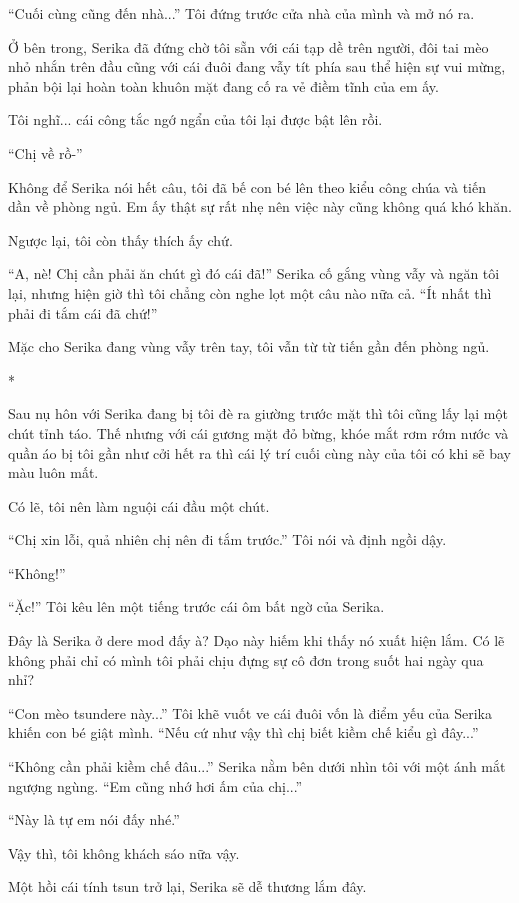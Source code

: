{``Cuối cùng cũng đến nhà...'' Tôi đứng trước cửa nhà của mình và mở nó
ra.

Ở bên trong, Serika đã đứng chờ tôi sẵn với cái tạp dề trên người, đôi
tai mèo nhỏ nhắn trên đầu cũng với cái đuôi đang vẫy tít phía sau thể
hiện sự vui mừng, phản bội lại hoàn toàn khuôn mặt đang cố ra vẻ điềm
tĩnh của em ấy.

Tôi nghĩ... cái công tắc ngớ ngẩn của tôi lại được bật lên rồi.

``Chị về rồ-''

Không để Serika nói hết câu, tôi đã bế con bé lên theo kiểu công chúa và
tiến dần về phòng ngủ. Em ấy thật sự rất nhẹ nên việc này cũng không quá
khó khăn.

Ngược lại, tôi còn thấy thích ấy chứ.

``A, nè! Chị cần phải ăn chút gì đó cái đã!'' Serika cố gắng vùng vẫy và
ngăn tôi lại, nhưng hiện giờ thì tôi chẳng còn nghe lọt một câu nào nữa
cả. ``Ít nhất thì phải đi tắm cái đã chứ!''

Mặc cho Serika đang vùng vẫy trên tay, tôi vẫn từ từ tiến gần đến phòng
ngủ.

*

Sau nụ hôn với Serika đang bị tôi đè ra giường trước mặt thì tôi cũng
lấy lại một chút tỉnh táo. Thế nhưng với cái gương mặt đỏ bừng, khóe mắt
rơm rớm nước và quần áo bị tôi gần như cởi hết ra thì cái lý trí cuối
cùng này của tôi có khi sẽ bay màu luôn mất.

Có lẽ, tôi nên làm nguội cái đầu một chút.

``Chị xin lỗi, quả nhiên chị nên đi tắm trước.'' Tôi nói và định ngồi
dậy.

``Không!''

``Ặc!'' Tôi kêu lên một tiếng trước cái ôm bất ngờ của Serika.

Đây là Serika ở dere mod đấy à? Dạo này hiếm khi thấy nó xuất hiện lắm.
Có lẽ không phải chỉ có mình tôi phải chịu đựng sự cô đơn trong suốt hai
ngày qua nhỉ?

``Con mèo tsundere này...'' Tôi khẽ vuốt ve cái đuôi vốn là điểm yếu của
Serika khiến con bé giật mình. ``Nếu cứ như vậy thì chị biết kiềm chế
kiểu gì đây...''

``Không cần phải kiềm chế đâu...'' Serika nằm bên dưới nhìn tôi với một
ánh mắt ngượng ngùng. ``Em cũng nhớ hơi ấm của chị...''

``Này là tự em nói đấy nhé.''

Vậy thì, tôi không khách sáo nữa vậy.

Một hồi cái tính tsun trở lại, Serika sẽ dễ thương lắm đây.
}
